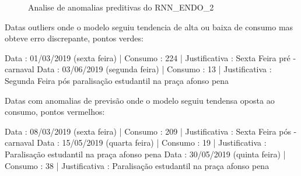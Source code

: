 \documentclass[	12pt, Times, openright, twoside, a4paper, english, brazil]{abntex2}
\begin{document}
            \begin{figure}[!ht]
              \caption{Analise de anomalias preditivas do RNN\_ENDO\_2 \label{fig:case1_rnn_endo2_test_dates} }
            \end{figure}
            Datas outliers onde o modelo seguiu tendencia de alta ou baixa de consumo mas obteve erro discrepante, pontos verdes:\newline
            
            Data : 01/03/2019 (sexta feira)    | Consumo : 224 | Justificativa : Sexta Feira pré - carnaval\newline
            Data : 03/06/2019 (segunda feira)  | Consumo : 13  | Justificativa : Segunda Feira pós paralisação estudantil na praça afonso pena\newline

            Datas com anomalias de previsão onde o modelo seguiu tendensa oposta ao consumo, pontos vermelhos:\newline

            Data : 08/03/2019 (sexta feira)    | Consumo : 209 | Justificativa : Sexta Feira pós - carnaval\newline
            Data : 15/05/2019 (quarta feira)   | Consumo : 19  | Justificativa : Paralisação estudantil na praça afonso pena\newline
            Data : 30/05/2019 (quinta feira)   | Consumo : 38  | Justificativa : Paralisação estudantil na praça afonso pena\newline
\end{document}

